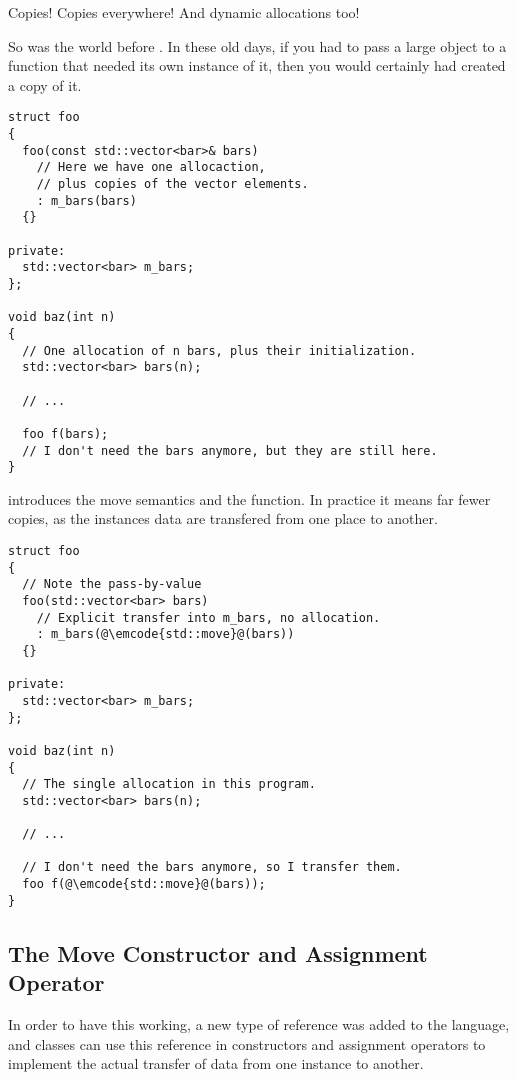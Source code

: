 \label{move}

Copies! Copies everywhere! And dynamic allocations too!

So was the world before . In these old days, if you had to pass
a large object to a function that needed its own instance of it, then
you would certainly had created a copy of it.

\begin{lstlisting}
struct foo
{
  foo(const std::vector<bar>& bars)
    // Here we have one allocaction,
    // plus copies of the vector elements.
    : m_bars(bars)
  {}

private:
  std::vector<bar> m_bars;
};

void baz(int n)
{
  // One allocation of n bars, plus their initialization.
  std::vector<bar> bars(n);

  // ...

  foo f(bars);
  // I don't need the bars anymore, but they are still here.
}
\end{lstlisting}

 introduces the move semantics and the 
function. In practice it means far fewer copies, as the instances data
are transfered from one place to another.

\begin{lstlisting}
struct foo
{
  // Note the pass-by-value
  foo(std::vector<bar> bars)
    // Explicit transfer into m_bars, no allocation.
    : m_bars(@\emcode{std::move}@(bars))
  {}

private:
  std::vector<bar> m_bars;
};

void baz(int n)
{
  // The single allocation in this program.
  std::vector<bar> bars(n);

  // ...

  // I don't need the bars anymore, so I transfer them.
  foo f(@\emcode{std::move}@(bars));
}
\end{lstlisting}

\subsection{The Move Constructor and Assignment Operator}

In order to have this working, a new type of reference was added to
the language, and classes can use this reference in constructors and
assignment operators to implement the actual transfer of data from one
instance to another.

